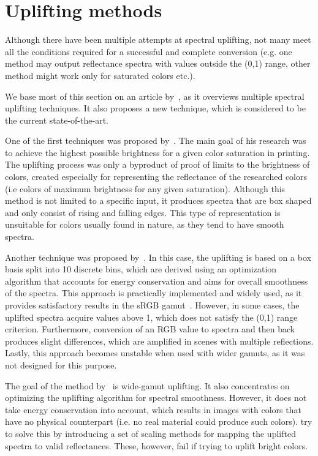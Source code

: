 \section{Uplifting methods} \label{sec:upliftingMethods}

Although there have been multiple attempts at spectral uplifting, not many meet all the conditions required for a successful and complete conversion (e.g. one method may output reflectance spectra with values outside the (0,1) range, other method might work only for saturated colors etc.).

We base most of this section on an article by~\citet{upsamplingTechniques}, as it overviews multiple spectral uplifting techniques. It also proposes a new technique, which is considered to be the current state-of-the-art.

One of the first techniques was proposed by~\citet{upsamplingMacAdam}. The main goal of his research was to achieve the highest possible brightness for a given color saturation in printing. The uplifting process was only a byproduct of proof of limits to the brightness of colors, created especially for representing the reflectance of the researched colors (i.e colors of maximum brightness for any given saturation). Although this method is not limited to a specific input, it produces spectra that are box shaped and only consist of rising and falling edges. This type of representation is unsuitable for colors usually found in nature, as they tend to have smooth spectra.

Another technique was proposed by~\citet{upsamplingSmits}. In this case, the uplifting is based on a box basis split into 10 discrete bins, which are derived using an optimization algorithm that accounts for energy conservation and aims for overall smoothness of the spectra. This approach is practically implemented and widely used, as it provides satisfactory results in the sRGB gamut~\cite{upsamplingJakobHanika}. However, in some cases, the uplifted spectra acquire values above 1, which does not satisfy the (0,1) range criterion. Furthermore, conversion of an RGB value to spectra and then back produces slight differences, which are amplified in scenes with multiple reflections. Lastly, this approach becomes unstable when used with wider gamuts, as it was not designed for this purpose.

The goal of the method by~\citet{upsamplingMeng} is wide-gamut uplifting. It also concentrates on optimizing the uplifting algorithm for spectral smoothness. However, it does not take energy conservation into account, which results in images with colors that have no physical counterpart (i.e. no real material could produce such colors). \citet{upsamplingMeng} try to solve this by introducing a set of scaling methods for mapping the uplifted spectra to valid reflectances. These, however, fail if trying to uplift bright colors. 

